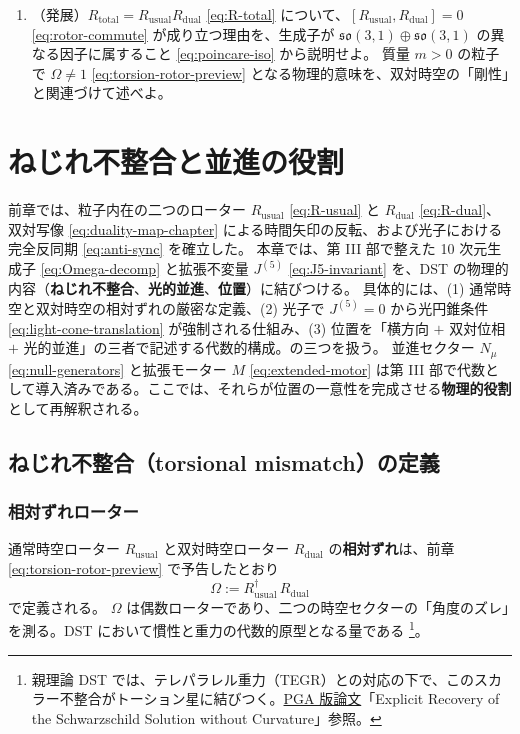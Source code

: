\documentclass[dvipdfmx,a4paper,oneside]{jsbook}
\numberwithin{equation}{chapter}
\begin{document}
\begin{enumerate}[leftmargin=2em]
  \item （発展）\(R_{\mathrm{total}} = R_{\mathrm{usual}} R_{\mathrm{dual}}\) \eqref{eq:R-total} について、\([R_{\mathrm{usual}}, R_{\mathrm{dual}}] = 0\) \eqref{eq:rotor-commute} が成り立つ理由を、生成子が \(\mathfrak{so}(3,1) \oplus \mathfrak{so}(3,1)\) の異なる因子に属すること \eqref{eq:poincare-iso} から説明せよ。
  質量 \(m > 0\) の粒子で \(\Omega \neq 1\) \eqref{eq:torsion-rotor-preview} となる物理的意味を、双対時空の「剛性」と関連づけて述べよ。
\end{enumerate}

\newpage

\chapter{ねじれ不整合と並進の役割}

前章では、粒子内在の二つのローター \(R_{\mathrm{usual}}\) \eqref{eq:R-usual} と \(R_{\mathrm{dual}}\) \eqref{eq:R-dual}、双対写像 \eqref{eq:duality-map-chapter} による時間矢印の反転、および光子における完全反同期 \eqref{eq:anti-sync} を確立した。
本章では、第 III 部で整えた 10 次元生成子 \eqref{eq:Omega-decomp} と拡張不変量 \(J^{(5)}\) \eqref{eq:J5-invariant} を、DST の物理的内容（\textbf{ねじれ不整合}、\textbf{光的並進}、\textbf{位置}）に結びつける。
具体的には、(1) 通常時空と双対時空の相対ずれの厳密な定義、(2) 光子で \(J^{(5)} = 0\) から光円錐条件 \eqref{eq:light-cone-translation} が強制される仕組み、(3) 位置を「横方向 \(+\) 双対位相 \(+\) 光的並進」の三者で記述する代数的構成。の三つを扱う。
並進セクター \(N_\mu\) \eqref{eq:null-generators} と拡張モーター \(M\) \eqref{eq:extended-motor} は第 III 部で代数として導入済みである。ここでは、それらが位置の一意性を完成させる\textbf{物理的役割}として再解釈される。

\section{ねじれ不整合（torsional mismatch）の定義}

\subsection{相対ずれローター}

通常時空ローター \(R_{\mathrm{usual}}\) と双対時空ローター \(R_{\mathrm{dual}}\) の\textbf{相対ずれ}は、前章 \eqref{eq:torsion-rotor-preview} で予告したとおり
\begin{equation}
  \Omega := R_{\mathrm{usual}}^\dagger\, R_{\mathrm{dual}}
  \label{eq:torsion-rotor}
\end{equation}
で定義される。
\(\Omega\) は偶数ローターであり、二つの時空セクターの「角度のズレ」を測る。DST において慣性と重力の代数的原型となる量である \footnote{親理論 DST では、テレパラレル重力（TEGR）との対応の下で、このスカラー不整合がトーション星に結びつく。\hyperref[sec:sister-manuscripts]{PGA 版論文}「Explicit Recovery of the Schwarzschild Solution without Curvature」参照。}。
\end{document}
